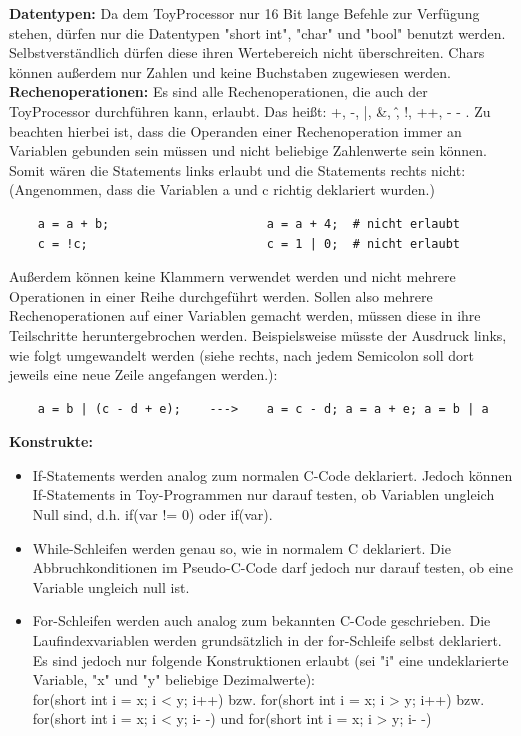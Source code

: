 \documentclass{article}
\begin{document}
\normalsize
\noindent \textbf{Datentypen:} Da dem ToyProcessor nur 16 Bit lange Befehle zur
Verfügung stehen, dürfen nur die Datentypen "short int", "char" und "bool"
benutzt werden. Selbstverständlich dürfen diese ihren Wertebereich nicht
überschreiten. Chars können außerdem nur Zahlen und keine Buchstaben zugewiesen
werden. \\

\noindent \textbf{Rechenoperationen:} Es sind alle Rechenoperationen, die
auch der ToyProcessor durchführen kann, erlaubt. Das heißt:
+, -, |, \&, \^, !, ++, - - .
Zu beachten hierbei ist, dass die Operanden einer Rechenoperation immer
an Variablen gebunden sein müssen und nicht beliebige Zahlenwerte sein können.
Somit wären die Statements links erlaubt und die Statements rechts nicht: (Angenommen,
dass die Variablen a und c richtig deklariert wurden.)
\begin{lstlisting}
    a = a + b;                      a = a + 4;  # nicht erlaubt
    c = !c;                         c = 1 | 0;  # nicht erlaubt
\end{lstlisting}

\noindent Außerdem können keine Klammern verwendet werden und nicht mehrere Operationen in einer
Reihe durchgeführt werden. Sollen also mehrere Rechenoperationen
auf einer Variablen gemacht werden, müssen diese in ihre Teilschritte heruntergebrochen werden.
Beispielsweise müsste der Ausdruck links, wie folgt umgewandelt werden (siehe rechts, nach jedem Semicolon
soll dort jeweils eine neue Zeile angefangen werden.):
\begin{lstlisting}
    a = b | (c - d + e);    --->    a = c - d; a = a + e; a = b | a
\end{lstlisting}

\noindent \textbf{Konstrukte:}
\begin{itemize}
    \item   If-Statements werden analog zum normalen
            C-Code deklariert. Jedoch können If-Statements in Toy-Programmen nur darauf testen, ob
            Variablen ungleich Null sind, d.h. if(var != 0) oder if(var).
    \item   While-Schleifen werden genau so, wie in
            normalem C deklariert. Die Abbruchkonditionen im Pseudo-C-Code darf jedoch
            nur darauf testen, ob eine Variable ungleich null ist.
    \item   For-Schleifen werden auch analog zum
            bekannten C-Code geschrieben. Die Laufindexvariablen werden grundsätzlich in der
            for-Schleife selbst deklariert. Es sind jedoch nur folgende Konstruktionen
            erlaubt (sei "i" eine undeklarierte Variable, "x" und "y" beliebige
            Dezimalwerte):\\
            for(short int i = x; i < y; i++) bzw. for(short int i = x; i > y; i++) bzw.
            for(short int i = x; i < y; i- -) und for(short int i = x; i > y; i- -)
\end{itemize}
\end{document}
